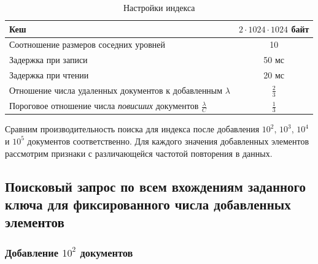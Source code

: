 \begin{table}[H]
      \caption{Настройки индекса}
      \centering
      \small
      \singlespacing
      \begin{tabular}{|l|c|}
            \hline
            Кеш                                                                           & $2\cdot 1024\cdot 1024$ байт \\ \hline
            Соотношение размеров соседних уровней                                         & 10               \\ \hline
            Задержка при записи                                                           & 50 мс            \\ \hline
            Задержка при чтении                                                           & 20 мс            \\ \hline
            Отношение числа удаленных документов к добавленным $\lambda$                  & $\frac{2}{3}$    \\ \hline
            Пороговое отношение числа \textit{повисших} документов $\frac{\lambda}{C}$    & $\frac{1}{3}$    \\ \hline
\end{tabular}
\label{tab:lsm_settings}
\end{table}

Сравним производительность поиска для индекса после добавления $10^2$, $10^3$, $10^4$ и $10^5$
документов соответственно. Для каждого значения добавленных элементов рассмотрим
признаки с различающейся частотой повторения в данных.

\subsection{Поисковый запрос по всем вхождениям заданного ключа для фиксированного числа добавленных элементов}

\subsubsection{Добавление $10^2$ документов}

